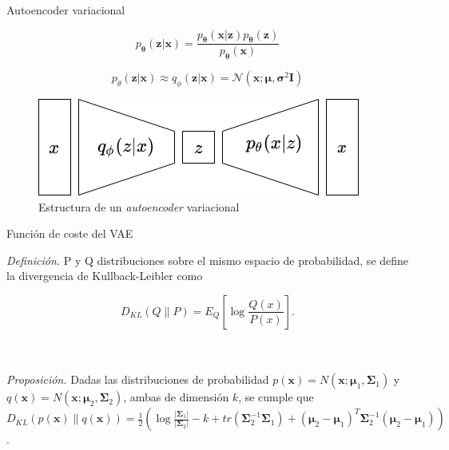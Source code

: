\documentclass[spanish]{beamer}
\begin{document}
\begin{frame}{Autoencoder variacional}

$$ p_{\boldsymbol{\theta}}(\textbf{z}|\textbf{x}) = \frac{p_{\boldsymbol{\theta}}(\textbf{x}|\textbf{z})p_{\boldsymbol{\theta}}(\textbf{z})}{p_{\boldsymbol{\theta}}(\textbf{x})}$$

$$p_{\theta}(\textbf{z} \vert \textbf{x}) \approx q_{\phi}(\textbf{z} \vert \textbf{x}) = \mathcal{N}(\textbf{x};\boldsymbol{\mu}, \boldsymbol{\sigma}^2\textbf{I}) $$

\begin{figure}
\includegraphics[scale=0.6]{img/vae.png}
\caption{Estructura de un \textit{autoencoder} variacional}
\end{figure}

\end{frame}

\begin{frame}{Función de coste del VAE}

\textit{Definición.} P y Q distribuciones sobre el mismo espacio de probabilidad, se define la divergencia de Kullback-Leibler como

$$D_{KL}(Q \parallel P) = E_Q \left[ \log \frac{Q(x)}{P(x)} \right].$$
\\~\

\textit{Proposición. } Dadas las distribuciones de probabilidad  $p(\textbf{x}) = N(\textbf{x};\boldsymbol{\mu}_1, \boldsymbol{\Sigma}_1) $ y $q(\textbf{x}) = N(\textbf{x};\boldsymbol{\mu}_2, \boldsymbol{\Sigma}_2)$, ambas de dimensión $k$,
se cumple que $D_{KL}(p(\textbf{x}) \parallel q(\textbf{x})) = \frac{1}{2} \left( \log \frac{|\boldsymbol{\Sigma}_1|}{|\boldsymbol{\Sigma}_2|} - k + tr(\boldsymbol{\Sigma}_2^{-1}\boldsymbol{\Sigma}_1) + (\boldsymbol{\mu}_2 - \boldsymbol{\mu}_1)^T \boldsymbol{\Sigma}_2^{-1} (\boldsymbol{\mu}_2 - \boldsymbol{\mu}_1) \right)$.
\end{frame}
\end{document}
